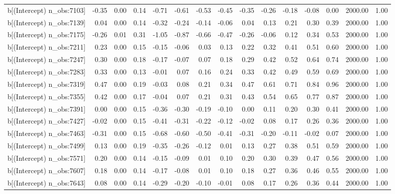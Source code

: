 \begin{table}[ht]
\begin{tabular}{rrrrrrrrrrrrrrr}
  b[(Intercept) n\_obs:7103] & -0.35 & 0.00 & 0.14 & -0.71 & -0.61 & -0.53 & -0.45 & -0.35 & -0.26 & -0.18 & -0.08 & 0.00 & 2000.00 & 1.00 \\ 
  b[(Intercept) n\_obs:7139] & 0.04 & 0.00 & 0.14 & -0.32 & -0.24 & -0.14 & -0.06 & 0.04 & 0.13 & 0.21 & 0.30 & 0.39 & 2000.00 & 1.00 \\ 
  b[(Intercept) n\_obs:7175] & -0.26 & 0.01 & 0.31 & -1.05 & -0.87 & -0.66 & -0.47 & -0.26 & -0.06 & 0.12 & 0.34 & 0.53 & 2000.00 & 1.00 \\ 
  b[(Intercept) n\_obs:7211] & 0.23 & 0.00 & 0.15 & -0.15 & -0.06 & 0.03 & 0.13 & 0.22 & 0.32 & 0.41 & 0.51 & 0.60 & 2000.00 & 1.00 \\ 
  b[(Intercept) n\_obs:7247] & 0.30 & 0.00 & 0.18 & -0.17 & -0.07 & 0.07 & 0.18 & 0.29 & 0.42 & 0.52 & 0.64 & 0.74 & 2000.00 & 1.00 \\ 
  b[(Intercept) n\_obs:7283] & 0.33 & 0.00 & 0.13 & -0.01 & 0.07 & 0.16 & 0.24 & 0.33 & 0.42 & 0.49 & 0.59 & 0.69 & 2000.00 & 1.00 \\ 
  b[(Intercept) n\_obs:7319] & 0.47 & 0.00 & 0.19 & -0.03 & 0.08 & 0.21 & 0.34 & 0.47 & 0.61 & 0.71 & 0.84 & 0.96 & 2000.00 & 1.00 \\ 
  b[(Intercept) n\_obs:7355] & 0.42 & 0.00 & 0.17 & -0.04 & 0.07 & 0.21 & 0.31 & 0.43 & 0.54 & 0.65 & 0.77 & 0.87 & 2000.00 & 1.00 \\ 
  b[(Intercept) n\_obs:7391] & 0.00 & 0.00 & 0.15 & -0.36 & -0.30 & -0.19 & -0.10 & 0.00 & 0.11 & 0.20 & 0.30 & 0.41 & 2000.00 & 1.00 \\ 
  b[(Intercept) n\_obs:7427] & -0.02 & 0.00 & 0.15 & -0.41 & -0.31 & -0.22 & -0.12 & -0.02 & 0.08 & 0.17 & 0.26 & 0.36 & 2000.00 & 1.00 \\ 
  b[(Intercept) n\_obs:7463] & -0.31 & 0.00 & 0.15 & -0.68 & -0.60 & -0.50 & -0.41 & -0.31 & -0.20 & -0.11 & -0.02 & 0.07 & 2000.00 & 1.00 \\ 
  b[(Intercept) n\_obs:7499] & 0.13 & 0.00 & 0.19 & -0.35 & -0.26 & -0.12 & 0.01 & 0.13 & 0.27 & 0.38 & 0.51 & 0.59 & 2000.00 & 1.00 \\ 
  b[(Intercept) n\_obs:7571] & 0.20 & 0.00 & 0.14 & -0.15 & -0.09 & 0.01 & 0.10 & 0.20 & 0.30 & 0.39 & 0.47 & 0.56 & 2000.00 & 1.00 \\ 
  b[(Intercept) n\_obs:7607] & 0.18 & 0.00 & 0.14 & -0.17 & -0.08 & 0.01 & 0.10 & 0.18 & 0.27 & 0.36 & 0.46 & 0.55 & 2000.00 & 1.00 \\ 
  b[(Intercept) n\_obs:7643] & 0.08 & 0.00 & 0.14 & -0.29 & -0.20 & -0.10 & -0.01 & 0.08 & 0.17 & 0.26 & 0.36 & 0.44 & 2000.00 & 1.00 \\ 

\end{tabular}
\end{table}
